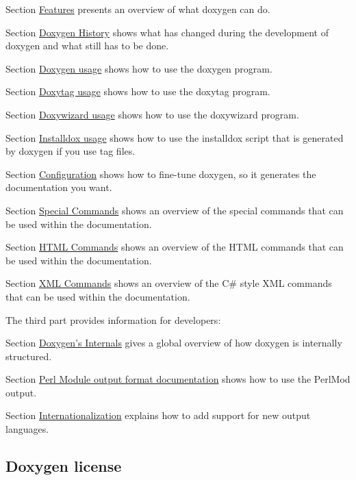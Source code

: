 \begin{DoxyItemize}
\item Section \hyperlink{features}{Features} presents an overview of what doxygen can do. 
\item Section \hyperlink{history}{Doxygen History} shows what has changed during the development of doxygen and what still has to be done. 
\item Section \hyperlink{doxygen_usage}{Doxygen usage} shows how to use the {\ttfamily doxygen} program. 
\item Section \hyperlink{doxytag_usage}{Doxytag usage} shows how to use the {\ttfamily doxytag} program. 
\item Section \hyperlink{doxywizard_usage}{Doxywizard usage} shows how to use the {\ttfamily doxywizard} program. 
\item Section \hyperlink{installdox_usage}{Installdox usage} shows how to use the {\ttfamily installdox} script that is generated by doxygen if you use tag files. 
\item Section \hyperlink{config}{Configuration} shows how to fine-\/tune doxygen, so it generates the documentation you want. 
\item Section \hyperlink{commands}{Special Commands} shows an overview of the special commands that can be used within the documentation. 
\item Section \hyperlink{htmlcmds}{HTML Commands} shows an overview of the HTML commands that can be used within the documentation. 
\item Section \hyperlink{xmlcmds}{XML Commands} shows an overview of the C\# style XML commands that can be used within the documentation. 
\end{DoxyItemize}

The third part provides information for developers:


\begin{DoxyItemize}
\item Section \hyperlink{arch}{Doxygen's Internals} gives a global overview of how doxygen is internally structured. 
\item Section \hyperlink{perlmod}{Perl Module output format documentation} shows how to use the PerlMod output. 
\item Section \hyperlink{langhowto}{Internationalization} explains how to add support for new output languages. 
\end{DoxyItemize}

\par
\subsection*{Doxygen license}

